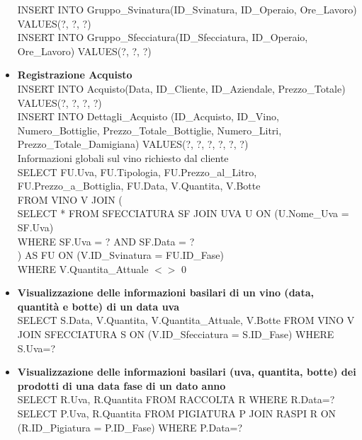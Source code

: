 \documentclass{article}
\begin{document}
\begin{itemize}
INSERT INTO Gruppo\_Svinatura(ID\_Svinatura, ID\_Operaio, Ore\_Lavoro) VALUES(?, ?, ?)\\\newline
INSERT INTO Gruppo\_Sfecciatura(ID\_Sfecciatura, ID\_Operaio, Ore\_Lavoro) VALUES(?, ?, ?)\\\newline
\newpage
\item \textbf{Registrazione Acquisto}\\\newline
INSERT INTO Acquisto(Data, ID\_Cliente, ID\_Aziendale, Prezzo\_Totale) VALUES(?, ?, ?, ?)\\\newline
INSERT INTO Dettagli\_Acquisto (ID\_Acquisto,  ID\_Vino, Numero\_Bottiglie, Prezzo\_Totale\_Bottiglie, Numero\_Litri,  Prezzo\_Totale\_Damigiana) VALUES(?, ?, ?, ?, ?, ?)\\\newline
Informazioni globali sul vino richiesto dal cliente\\
SELECT FU.Uva, FU.Tipologia, FU.Prezzo\_al\_Litro, FU.Prezzo\_a\_Bottiglia, FU.Data, V.Quantita, V.Botte\\
FROM VINO V JOIN (\\
SELECT *
FROM SFECCIATURA SF JOIN UVA U ON (U.Nome\_Uva = SF.Uva)\\
WHERE SF.Uva = ?
AND SF.Data = ?\\
) AS FU ON (V.ID\_Svinatura = FU.ID\_Fase) \\
WHERE V.Quantita\_Attuale $<$$>$ 0\\\newline
\item \textbf{Visualizzazione delle informazioni basilari di un vino (data, quantità e botte) di un data uva}\\\newline
SELECT S.Data, V.Quantita,  V.Quantita\_Attuale, V.Botte FROM VINO V JOIN SFECCIATURA S ON (V.ID\_Sfecciatura = S.ID\_Fase) WHERE S.Uva=?\\\newline
\item \textbf{Visualizzazione delle informazioni basilari (uva, quantita, botte) dei prodotti di una data fase di un dato anno}\\\newline
SELECT R.Uva, R.Quantita FROM RACCOLTA R WHERE R.Data=?\\\newline
SELECT P.Uva, R.Quantita FROM PIGIATURA P JOIN RASPI R ON (R.ID\_Pigiatura = P.ID\_Fase) WHERE P.Data=?\\\newline
$$
\end{itemize}
\end{document}
